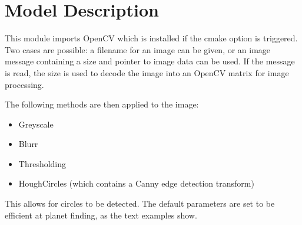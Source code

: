 
\section{Model Description}

This module imports OpenCV which is installed if the cmake option is triggered. Two cases are possible: a filename for an image can be given, or an image message containing a size and pointer to image data can be used. If the message is read, the size is used to decode the image into an OpenCV matrix for image processing.

The following methods are then applied to the image:
\begin{itemize}
\item Greyscale
\item Blurr
\item Thresholding
\item HoughCircles (which contains a Canny edge detection transform)
\end{itemize}

This allows for circles to be detected. The default parameters are set to be efficient at planet finding, as the text examples show. 
